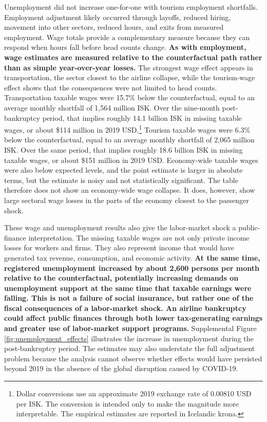 \documentclass[12pt]{article}
\begin{document}
Unemployment did not increase one-for-one with tourism employment shortfalls. Employment adjustment likely occurred through layoffs, reduced hiring, movement into other sectors, reduced hours, and exits from measured employment. Wage totals provide a complementary measure because they can respond when hours fall before head counts change. \textbf{As with employment, wage estimates are measured relative to the counterfactual path rather than as simple year-over-year losses.} The strongest wage effect appears in transportation, the sector closest to the airline collapse, while the tourism-wage effect shows that the consequences were not limited to head counts. Transportation taxable wages were 15.7\% below the counterfactual, equal to an average monthly shortfall of 1,564 million ISK. Over the nine-month post-bankruptcy period, that implies roughly 14.1 billion ISK in missing taxable wages, or about \$114 million in 2019 USD.\footnote{Dollar conversions use an approximate 2019 exchange rate of 0.00810 USD per ISK. The conversion is intended only to make the magnitude more interpretable. The empirical estimates are reported in Icelandic krona.} Tourism taxable wages were 6.3\% below the counterfactual, equal to an average monthly shortfall of 2,065 million ISK. Over the same period, that implies roughly 18.6 billion ISK in missing taxable wages, or about \$151 million in 2019 USD. Economy-wide taxable wages were also below expected levels, and the point estimate is larger in absolute terms, but the estimate is noisy and not statistically significant. The table therefore does not show an economy-wide wage collapse. It does, however, show large sectoral wage losses in the parts of the economy closest to the passenger shock.

These wage and unemployment results also give the labor-market shock a public-finance interpretation. The missing taxable wages are not only private income losses for workers and firms. They also represent income that would have generated tax revenue, consumption, and economic activity. \textbf{At the same time, registered unemployment increased by about 2,600 persons per month relative to the counterfactual, potentially increasing demands on unemployment support at the same time that taxable earnings were falling. This is not a failure of social insurance, but rather one of the fiscal consequences of a labor-market shock. An airline bankruptcy could affect public finances through both lower tax-generating earnings and greater use of labor-market support programs.} Supplemental Figure \ref{fig:unemployment_effects} illustrates the increase in unemployment during the post-bankruptcy period. The estimates may also understate the full adjustment problem because the analysis cannot observe whether effects would have persisted beyond 2019 in the absence of the global disruption caused by COVID-19.
\end{document}
